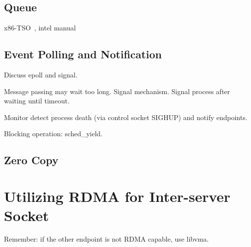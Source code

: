 \subsection{Queue}

x86-TSO~\cite{sewell2010x86}, intel manual~\cite{intel-manual}

\subsection{Event Polling and Notification}
\label{subsec:epoll}

Discuss epoll and signal.

Message passing may wait too long.
Signal mechanism. Signal process after waiting until timeout.

Monitor detect process death (via control socket SIGHUP) and notify endpoints.

Blocking operation: sched\_yield.


\subsection{Zero Copy}
\label{subsec:zerocopy}




\section{Utilizing RDMA for Inter-server Socket}
\label{sec:rdma}

Remember: if the other endpoint is not RDMA capable, use libvma.
